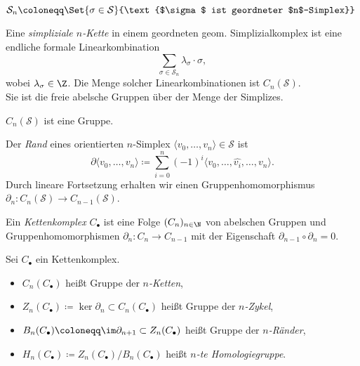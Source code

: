 \documentclass{cheat-sheet}
\newcommand{\angles}[1]{{\langle #1 \rangle}}
\newcommand{\Simpl}{\mathcal{S}} %
\newcommand{\CC}[1]{{#1}_{\bullet}} %
\begin{document}
\begin{nota}
  $\Simpl_n \coloneqq \Set{\sigma \in \Simpl}{\text{$\sigma$ ist geordneter $n$-Simplex}}$
\end{nota}

\begin{defn}
  Eine \emph{simpliziale $n$-Kette} in einem geordneten geom. Simplizialkomplex ist eine endliche formale Linearkombination
  \[ \sum_{\sigma \in \Simpl_n} \lambda_\sigma \cdot \sigma, \]
  wobei $\lambda_\sigma \in \Z$. Die Menge solcher Linearkombinationen ist $C_n(\Simpl)$.\\
  Sie ist die freie abelsche Gruppen über der Menge der Simplizes.
\end{defn}

\begin{bem}
  $C_n(\Simpl)$ ist eine Gruppe.
\end{bem}

\begin{defn}
  Der \emph{Rand} eines orientierten $n$-Simplex $\angles{v_0, \ldots, v_n} \in \Simpl$ ist
  \[ \partial \angles{v_0, \ldots, v_n} \coloneqq \sum_{i=0}^n (-1)^i \angles{v_0, \ldots, \hat{v_i}, \ldots, v_n}. \]
  Durch lineare Fortsetzung erhalten wir einen Gruppenhomomorphismus $\partial_n : C_n(\Simpl) \to C_{n-1}(\Simpl)$.
\end{defn}


\begin{defn}
  Ein \emph{Kettenkomplex} $\CC{C}$ ist eine Folge $(C_n)_{n \in \N}$ von abelschen Gruppen und Gruppenhomomorphismen $\partial_n : C_n \to C_{n-1}$ mit der Eigenschaft $\partial_{n-1} \circ \partial_n = 0$.
\end{defn}

\begin{defn}
  Sei $\CC{C}$ ein Kettenkomplex.
  \begin{itemize}
    \item $C_n(\CC{C})$ heißt Gruppe der \emph{$n$-Ketten},
    \item $Z_n(\CC{C}) \coloneqq \ker \partial_n \subset C_n(\CC{C})$ heißt Gruppe der \emph{$n$-Zykel},
    \item $B_n(\CC{C}) \coloneqq \im \partial_{n+1} \subset Z_n(\CC{C})$ heißt Gruppe der \emph{$n$-Ränder},
    \item $H_n(\CC{C}) \coloneqq Z_n(\CC{C}) / B_n(\CC{C})$ heißt \emph{$n$-te Homologiegruppe}.
  \end{itemize}
\end{defn}
\end{document}
